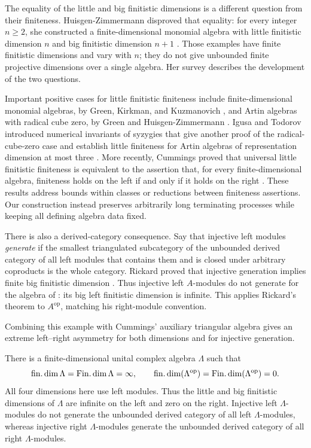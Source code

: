 The equality of the little and big finitistic dimensions is a different
question from their finiteness. Huisgen-Zimmermann disproved that equality:
for every integer \(n\ge2\), she constructed a finite-dimensional monomial
algebra with little finitistic dimension \(n\) and big finitistic dimension
\(n+1\) \cite{HuisgenZimmermann1992}. Those examples have finite finitistic
dimensions and vary with \(n\); they do not give unbounded finite projective
dimensions over a single algebra. Her survey \cite{HuisgenZimmermann1995}
describes the development of the two questions.

Important positive cases for little finitistic finiteness include
finite-dimensional monomial algebras,
by Green, Kirkman, and Kuzmanovich \cite{GreenKirkmanKuzmanovich1991},
and Artin algebras with radical cube zero, by Green and
Huisgen-Zimmermann \cite{GreenHuisgenZimmermann1991}.
Igusa and Todorov introduced numerical invariants of syzygies that give
another proof of the radical-cube-zero case and establish little
finiteness for Artin algebras of representation dimension at most three
\cite[Corollaries~7 and~9]{IgusaTodorov2005}.
More recently, Cummings proved that universal little finitistic
finiteness is equivalent to the assertion that, for every
finite-dimensional algebra, finiteness holds on the left if and only
if it holds on the right \cite[Theorem~A]{Cummings2024}.
These results address bounds within classes or reductions between
finiteness assertions. Our construction instead preserves arbitrarily
long terminating processes while keeping all defining algebra data fixed.

There is also a derived-category consequence. Say that injective left
modules \emph{generate} if the smallest triangulated subcategory of the
unbounded derived category of all left modules that contains them and is
closed under arbitrary coproducts is the whole category. Rickard proved
that injective generation implies finite big finitistic dimension
\cite[Theorem~4.3]{Rickard2019}. Thus injective left \(A\)-modules do not
generate for the algebra of : its big left finitistic
dimension is infinite. This applies Rickard's theorem to
\(A^{\mathrm{op}}\), matching his right-module convention.

Combining this example with Cummings' auxiliary triangular algebra gives
an extreme left--right asymmetry for both dimensions and for injective
generation.

\begin{corollary}
\label{cor:left-right-asymmetry}
There is a finite-dimensional unital complex algebra \(\Lambda\) such that
\[
\operatorname{fin.dim} \Lambda=\operatorname{Fin.dim} \Lambda=\infty,
\qquad
\operatorname{fin.dim}(\Lambda^{\mathrm{op}})=\operatorname{Fin.dim}(\Lambda^{\mathrm{op}})=0.
\]
All four dimensions here use left modules. Thus the little and big
finitistic dimensions of \(\Lambda\) are infinite on the left and zero
on the right. Injective left \(\Lambda\)-modules do not generate the
unbounded derived category of all left \(\Lambda\)-modules, whereas
injective right \(\Lambda\)-modules generate the unbounded derived
category of all right \(\Lambda\)-modules.
\end{corollary}


